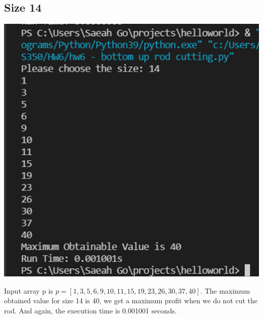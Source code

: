 \documentclass{article}
\begin{document}
\subsection{\textbf{Size 14}}
\begin{center}
\includegraphics[scale = 0.5]{size 14.png} \\
\end{center}
Input array p is $p = [1, 3, 5, 6, 9, 10, 11, 15, 19, 23, 26, 30, 37, 40]$. The maximum obtained value for size 14 is 40, we get a maximum profit when we do not cut the rod. And again, the execution time is 0.001001 seconds. 
\end{document}
